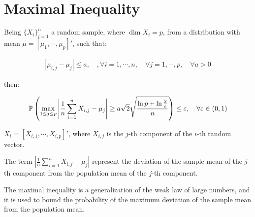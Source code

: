 \section{Maximal Inequality}

Being $\{X_i\}_{i=1}^n$ a random sample, where $\dim{X_i} = p$, from a distribution with mean $\mu = [\mu_1, \cdots, \mu_p]'$, such that:

\begin{align*}
|\mu_{i,j} - \mu_{j}| \leq a, \quad, \forall i = 1, \cdots, n, \quad \forall j = 1, \cdots, p, \quad \forall a > 0
\end{align*}

then: 

\begin{align*}
\mathbb{P}\left(
    \max_{1 \leq j \leq p}{
        \left|
            \frac{1}{n} \sum_{i=1}^{n} X_{i,j} - \mu_{j}
        \right|
    }
    \geq
    a \sqrt{2} \sqrt{
        \dfrac{\ln p + \ln \frac{2}{\varepsilon}}{n}
    }
\right) \leq \varepsilon, \quad \forall \varepsilon \in (0, 1)
\end{align*}

$X_i = [X_{i,1}, \cdots, X_{i,p}]'$, where $X_{i,j}$ is the $j$-th component of the $i$-th random vector.

The term 
$
\left|
        \frac{1}{n} \sum_{i=1}^{n} X_{i,j} - \mu_{j}
\right|
$
represent the deviation of the sample mean of the $j$-th component from the population mean of the $j$-th component.

The maximal inequality is a generalization of the weak law of large numbers, and it is used to bound the probability of the maximum deviation of the sample mean from the population mean.
